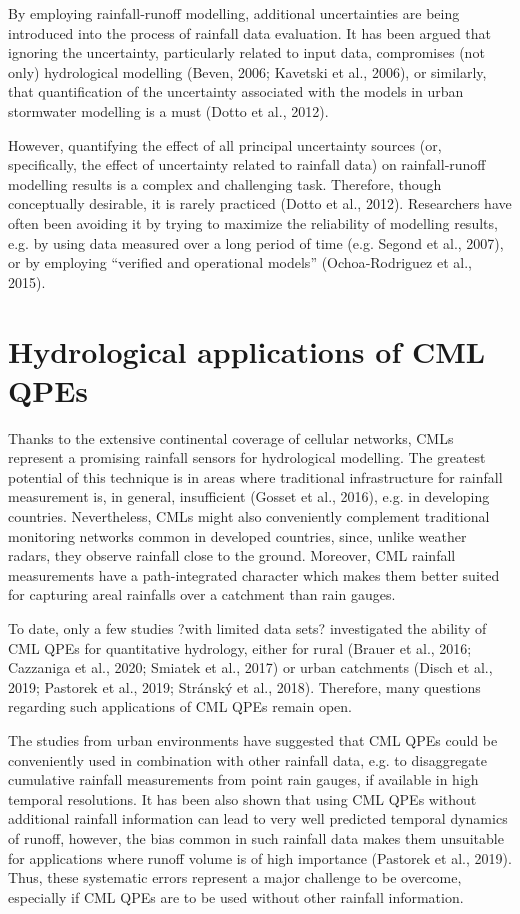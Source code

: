 \documentclass{ctuthesis}\usepackage[]{graphicx}\usepackage[]{color}
\begin{document}
By employing rainfall‐runoff modelling, additional uncertainties are being introduced into the process
of rainfall data evaluation. It has been argued that ignoring the uncertainty, particularly related to
input data, compromises (not only) hydrological modelling (Beven, 2006; Kavetski et al., 2006), or
similarly, that quantification of the uncertainty associated with the models in urban stormwater
modelling is a must (Dotto et al., 2012).

However, quantifying the effect of all principal uncertainty sources (or, specifically, the effect of
uncertainty related to rainfall data) on rainfall‐runoff modelling results is a complex and challenging
task. Therefore, though conceptually desirable, it is rarely practiced (Dotto et al., 2012). Researchers
have often been avoiding it by trying to maximize the reliability of modelling results, e.g. by using
data measured over a long period of time (e.g. Segond et al., 2007), or by employing “verified and
operational models” (Ochoa‐Rodriguez et al., 2015).



\section{Hydrological applications of CML QPEs}

Thanks to the extensive continental coverage of cellular networks, CMLs represent a promising rainfall sensors for hydrological modelling. The greatest potential of this technique is in areas where traditional infrastructure for rainfall measurement is, in general, insufficient (Gosset et al., 2016), e.g. in developing countries. Nevertheless, CMLs might also conveniently complement traditional monitoring networks common in developed countries, since, unlike weather radars, they observe rainfall close to the ground. Moreover, CML rainfall measurements have a path-integrated character which makes them better suited for capturing areal rainfalls over a catchment than rain gauges. 

To date, only a few studies ?with limited data sets? investigated the ability of CML QPEs for quantitative hydrology, either for rural (Brauer et al., 2016; Cazzaniga et al., 2020; Smiatek et al., 2017)  or urban catchments (Disch et al., 2019; Pastorek et al., 2019; Stránský et al., 2018). Therefore, many questions regarding such applications of CML QPEs remain open.

The studies from urban environments have suggested that CML QPEs could be conveniently used in combination with other rainfall data, e.g. to disaggregate cumulative rainfall measurements from point rain gauges, if available in high temporal resolutions. It has been also shown that using CML QPEs without additional rainfall information can lead to very well predicted temporal dynamics of runoff, however, the bias common in such rainfall data makes them unsuitable for applications where runoff volume is of high importance (Pastorek et al., 2019). Thus, these systematic errors represent a major challenge to be overcome, especially if CML QPEs are to be used without other rainfall information.
\end{document}
